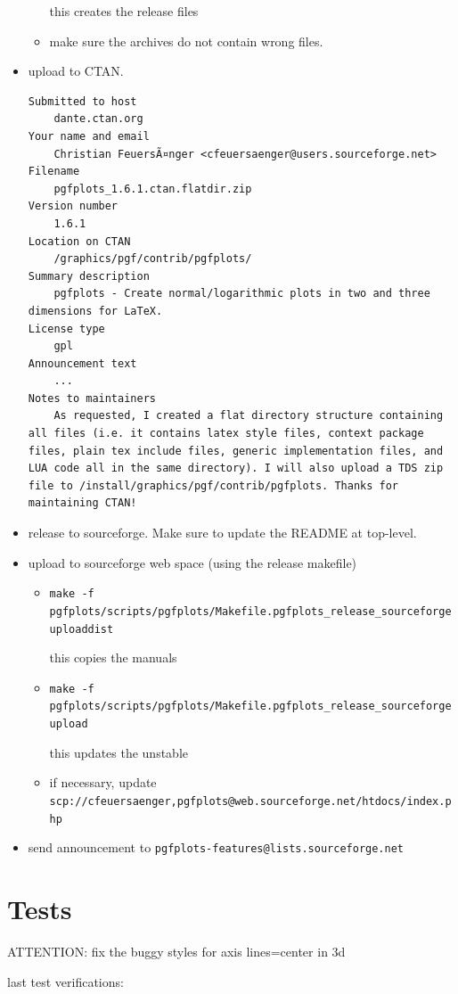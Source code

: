 \documentclass[a4paper]{article}
\begin{document}
\begin{itemize}
\begin{itemize}
			this creates the release files
			\item make sure the archives do not contain wrong files.
		\end{itemize}
	\item upload to CTAN.
\begin{verbatim}
Submitted to host
	dante.ctan.org
Your name and email
    Christian FeuersÃ¤nger <cfeuersaenger@users.sourceforge.net>
Filename
    pgfplots_1.6.1.ctan.flatdir.zip
Version number
    1.6.1
Location on CTAN
    /graphics/pgf/contrib/pgfplots/
Summary description
    pgfplots - Create normal/logarithmic plots in two and three dimensions for LaTeX.
License type
    gpl
Announcement text
	...
Notes to maintainers
    As requested, I created a flat directory structure containing all files (i.e. it contains latex style files, context package files, plain tex include files, generic implementation files, and LUA code all in the same directory). I will also upload a TDS zip file to /install/graphics/pgf/contrib/pgfplots. Thanks for maintaining CTAN! 
\end{verbatim}
	\item release to sourceforge. Make sure to update the README at top-level.
	\item upload to sourceforge web space (using the release makefile)
		\begin{itemize}
			\item \verb|make -f pgfplots/scripts/pgfplots/Makefile.pgfplots_release_sourceforge uploaddist|
				
				this copies the manuals
			\item \verb|make -f pgfplots/scripts/pgfplots/Makefile.pgfplots_release_sourceforge upload|

				this updates the unstable

			\item if necessary, update \verb|scp://cfeuersaenger,pgfplots@web.sourceforge.net/htdocs/index.php|
		\end{itemize}
	\item send announcement to \verb|pgfplots-features@lists.sourceforge.net|
\end{itemize}

\section{Tests}

ATTENTION: fix the buggy styles for axis lines=center in 3d

last test verifications:
\end{document}

